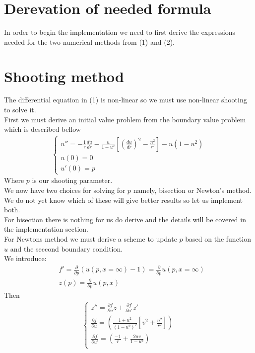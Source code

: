 \documentclass{article}
\begin{document}
\section{Derevation of needed formula}
In order to begin the implementation we need to first derive the expressions needed for the two numerical methods from (1) and (2).
\section{Shooting method}
The differential equation in (1) is non-linear so we must use non-linear shooting to solve it. \\
First we must derive an initial value problem from the boundary value problem which is described bellow 
\begin{align}
\begin{cases}
u'' = -\frac{1}{r}\frac{du}{dr} - \frac{u}{1-u^2}\left[\left(\frac{du}{dr}\right)^2 - \frac{n^2}{r^2}\right] - u(1-u^2) \\
u(0) = 0 \\
u'(0) = p
\end{cases}
\end{align}
Where $p$ is our shooting parameter. \\
We now have two choices for solving for $p$ namely, bisection or Newton's method. 
We do not yet know which of these will give better results so let us implement both.  \\
For bisection there is nothing for us do derive and the details will be covered in the implementation section. \\
For Newtons method we must derive a scheme to update $p$ based on the function $u$ and the seccond boundary condition.\\ 
We introduce:
\begin{align}
&f' = \frac{\partial }{\partial p}\left(u(p,x=\infty)-1\right) =  \frac{\partial }{\partial p} u(p,x=\infty) \\
&z(p) = \frac{\partial }{\partial p} u(p,x)
\end{align}
Then 
\begin{align}
\begin{cases}
z'' = \frac{\partial f}{\partial u}z + \frac{\partial f}{\partial u'}z' \\
 \frac{\partial f}{\partial u} = \left(\frac{1+u^2}{(1-u^2)^2}\left[ v^2 + \frac{n^2}{r^2} \right] \right)\\
 \frac{\partial f}{\partial u'} =  \left(\frac{-1}{r} + \frac{2uv}{1-u^2}\right)\\
\end{cases}
\end{align}
\end{document}
